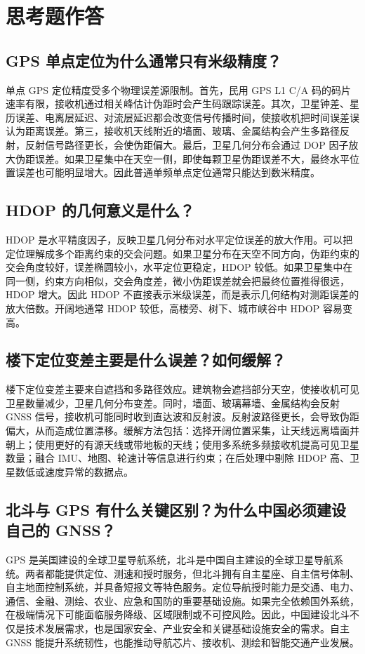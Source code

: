 \documentclass[UTF8,a4paper,12pt]{ctexart}
\begin{document}
\clearpage
\section{思考题作答}
\subsection{GPS 单点定位为什么通常只有米级精度？}
单点 GPS 定位精度受多个物理误差源限制。首先，民用 GPS L1 C/A 码的码片速率有限，接收机通过相关峰估计伪距时会产生码跟踪误差。其次，卫星钟差、星历误差、电离层延迟、对流层延迟都会改变信号传播时间，使接收机把时间误差误认为距离误差。第三，接收机天线附近的墙面、玻璃、金属结构会产生多路径反射，反射信号路径更长，会使伪距偏大。最后，卫星几何分布会通过 DOP 因子放大伪距误差。如果卫星集中在天空一侧，即使每颗卫星伪距误差不大，最终水平位置误差也可能明显增大。因此普通单频单点定位通常只能达到数米精度。

\subsection{HDOP 的几何意义是什么？}
HDOP 是水平精度因子，反映卫星几何分布对水平定位误差的放大作用。可以把定位理解成多个距离约束的交会问题。如果卫星分布在天空不同方向，伪距约束的交会角度较好，误差椭圆较小，水平定位更稳定，HDOP 较低。如果卫星集中在同一侧，约束方向相似，交会角度差，微小伪距误差就会把最终位置推得很远，HDOP 增大。因此 HDOP 不直接表示米级误差，而是表示几何结构对测距误差的放大倍数。开阔地通常 HDOP 较低，高楼旁、树下、城市峡谷中 HDOP 容易变高。

\subsection{楼下定位变差主要是什么误差？如何缓解？}
楼下定位变差主要来自遮挡和多路径效应。建筑物会遮挡部分天空，使接收机可见卫星数量减少，卫星几何分布变差。同时，墙面、玻璃幕墙、金属结构会反射 GNSS 信号，接收机可能同时收到直达波和反射波。反射波路径更长，会导致伪距偏大，从而造成位置漂移。缓解方法包括：选择开阔位置采集，让天线远离墙面并朝上；使用更好的有源天线或带地板的天线；使用多系统多频接收机提高可见卫星数量；融合 IMU、地图、轮速计等信息进行约束；在后处理中剔除 HDOP 高、卫星数低或速度异常的数据点。

\subsection{北斗与 GPS 有什么关键区别？为什么中国必须建设自己的 GNSS？}
GPS 是美国建设的全球卫星导航系统，北斗是中国自主建设的全球卫星导航系统。两者都能提供定位、测速和授时服务，但北斗拥有自主星座、自主信号体制、自主地面控制系统，并具备短报文等特色服务。定位导航授时能力是交通、电力、通信、金融、测绘、农业、应急和国防的重要基础设施。如果完全依赖国外系统，在极端情况下可能面临服务降级、区域限制或不可控风险。因此，中国建设北斗不仅是技术发展需求，也是国家安全、产业安全和关键基础设施安全的需求。自主 GNSS 能提升系统韧性，也能推动导航芯片、接收机、测绘和智能交通产业发展。
\end{document}
